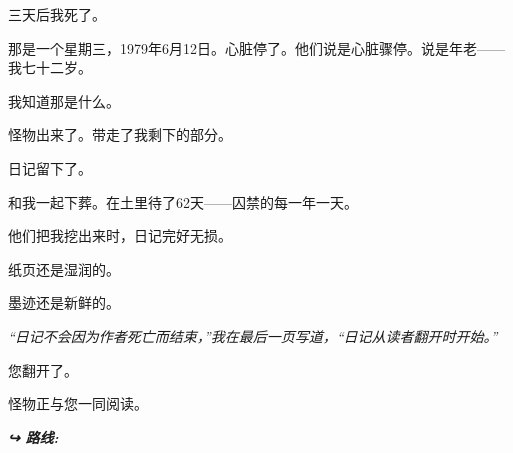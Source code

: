 \noindent 三天后我死了。

\noindent 那是一个星期三，1979年6月12日。心脏停了。他们说是心脏骤停。说是年老——我七十二岁。

\noindent 我知道那是什么。

\noindent 怪物出来了。带走了我剩下的部分。

\noindent 日记留下了。

\noindent 和我一起下葬。在土里待了62天——囚禁的每一年一天。

\noindent 他们把我挖出来时，日记完好无损。

\noindent 纸页还是湿润的。

\noindent 墨迹还是新鲜的。

\noindent \textit{“日记不会因为作者死亡而结束，”我在最后一页写道，“日记从读者翻开时开始。”}

\noindent 您翻开了。

\noindent 怪物正与您一同阅读。

\vspace{0.5em}
\noindent\textit{\textbf{↪ 路线:}  \rotasep {} \rotasep {}}

